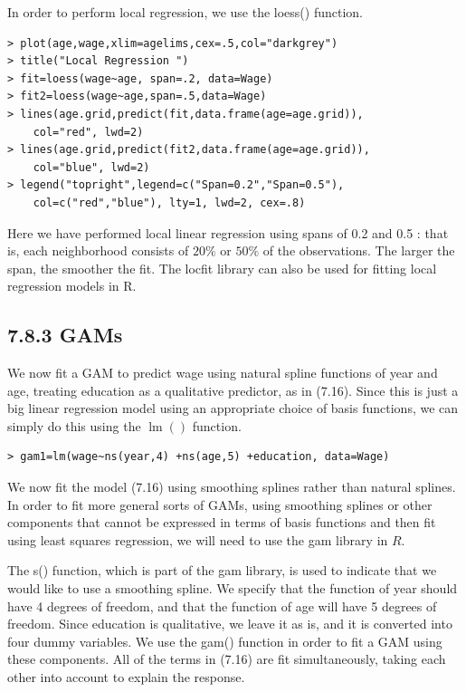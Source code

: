\documentclass[10pt]{article}
\begin{document}
In order to perform local regression, we use the loess() function.

\begin{verbatim}
> plot(age,wage,xlim=agelims,cex=.5,col="darkgrey")
> title("Local Regression ")
> fit=loess(wage~age, span=.2, data=Wage)
> fit2=loess(wage~age,span=.5,data=Wage)
> lines(age.grid,predict(fit,data.frame(age=age.grid)),
    col="red", lwd=2)
> lines(age.grid,predict(fit2,data.frame(age=age.grid)),
    col="blue", lwd=2)
> legend("topright",legend=c("Span=0.2","Span=0.5"),
    col=c("red","blue"), lty=1, lwd=2, cex=.8)
\end{verbatim}

Here we have performed local linear regression using spans of 0.2 and 0.5 : that is, each neighborhood consists of $20 \%$ or $50 \%$ of the observations. The larger the span, the smoother the fit. The locfit library can also be used for fitting local regression models in R.

\subsection*{7.8.3 GAMs}
We now fit a GAM to predict wage using natural spline functions of year and age, treating education as a qualitative predictor, as in (7.16). Since this is just a big linear regression model using an appropriate choice of basis functions, we can simply do this using the $\operatorname{lm}()$ function.

\begin{verbatim}
> gam1=lm(wage~ns(year,4) +ns(age,5) +education, data=Wage)
\end{verbatim}

We now fit the model (7.16) using smoothing splines rather than natural splines. In order to fit more general sorts of GAMs, using smoothing splines or other components that cannot be expressed in terms of basis functions and then fit using least squares regression, we will need to use the gam library in $R$.

The s() function, which is part of the gam library, is used to indicate that we would like to use a smoothing spline. We specify that the function of year should have 4 degrees of freedom, and that the function of age will have 5 degrees of freedom. Since education is qualitative, we leave it as is, and it is converted into four dummy variables. We use the gam() function in order to fit a GAM using these components. All of the terms in (7.16) are fit simultaneously, taking each other into account to explain the response.
\end{document}
